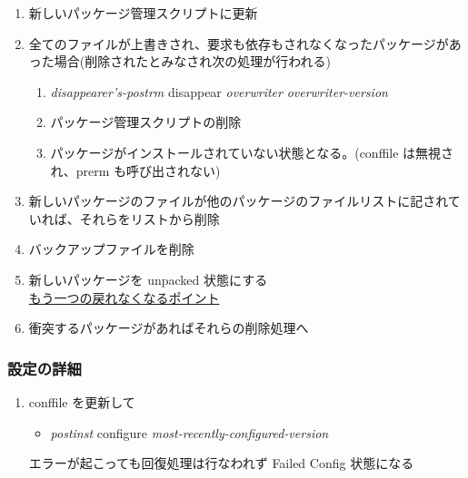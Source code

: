 \documentclass[mingoth,a4paper]{jsarticle}
\begin{document}
\begin{enumerate}
\item 新しいパッケージ管理スクリプトに更新

\item 全てのファイルが上書きされ、要求も依存もされなくなったパッケージがあった場合(削除されたとみなされ次の処理が行われる)
  \begin{enumerate}
  \item {\it disappearer's-postrm} disappear {\it overwriter} {\it overwriter-version}
  \item パッケージ管理スクリプトの削除
  \item パッケージがインストールされていない状態となる。(conffile は無視され、prerm も呼び出されない)
  \end{enumerate}

\item 新しいパッケージのファイルが他のパッケージのファイルリストに記されていれば、それらをリストから削除

\item バックアップファイルを削除

\item 新しいパッケージを unpacked 状態にする\\
{\underline {\Large もう一つの戻れなくなるポイント}}

\item 衝突するパッケージがあればそれらの削除処理へ

\end{enumerate}

\subsubsection{設定の詳細}
\begin{enumerate}
\item conffile を更新して
  \begin{itemize}
  \item {\it postinst} configure {\it most-recently-configured-version}
  \end{itemize}
  エラーが起こっても回復処理は行なわれず Failed Config 状態になる
\end{enumerate}
\end{document}
